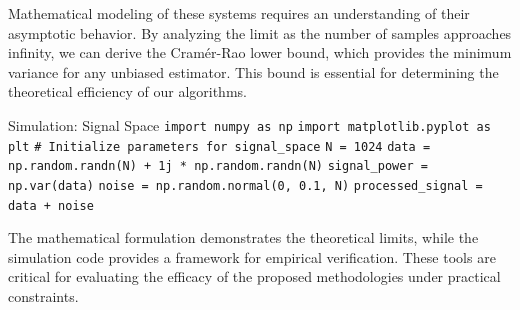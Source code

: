 Mathematical modeling of these systems requires an understanding of their asymptotic behavior. By analyzing the limit as the number of samples approaches infinity, we can derive the Cramér-Rao lower bound, which provides the minimum variance for any unbiased estimator. This bound is essential for determining the theoretical efficiency of our algorithms.

\begin{pythonbox}{Simulation: Signal Space}
\texttt{import numpy as np}
\texttt{import matplotlib.pyplot as plt}
\texttt{}
\texttt{\# Initialize parameters for signal\_space}
\texttt{N = 1024}
\texttt{data = np.random.randn(N) + 1j * np.random.randn(N)}
\texttt{signal\_power = np.var(data)}
\texttt{noise = np.random.normal(0, 0.1, N)}
\texttt{processed\_signal = data + noise}
\end{pythonbox}

\vspace{0.5cm}
The mathematical formulation demonstrates the theoretical limits, while the simulation code provides a framework for empirical verification. These tools are critical for evaluating the efficacy of the proposed methodologies under practical constraints.

